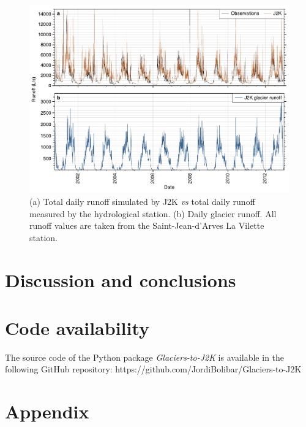 \begin{figure}[h]
\centering
\includegraphics[width=15cm]{Figures/hydro/Figure_5.pdf}
\caption{(a) Total daily runoff simulated by J2K \textit{vs} total daily runoff measured by the hydrological station. (b) Daily glacier runoff. All runoff values are taken from the Saint-Jean-d'Arves La Vilette station.} 
\label{hydro:fig5}
\end{figure}

\section{Discussion and conclusions}

\section{Code availability}

The source code of the Python package \textit{Glaciers-to-J2K} is available in the following GitHub repository: https://github.com/JordiBolibar/Glaciers-to-J2K

\section{Appendix}

